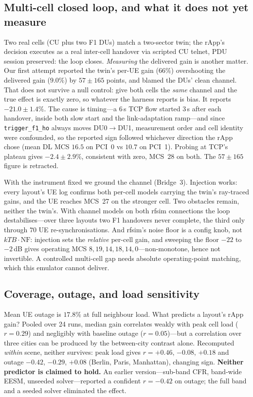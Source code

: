 \documentclass[conference]{IEEEtran}
\begin{document}
\subsection{Multi-cell closed loop, and what it does not yet measure}
\label{sec:multignb}
Two real cells (CU plus two F1 DUs) match a two-sector twin; the rApp's decision executes as a real inter-cell handover via scripted CU telnet, PDU session preserved: the loop closes. \emph{Measuring} the delivered gain is another matter. Our first attempt reported the twin's per-UE gain ($66\%$) overshooting the delivered gain ($9.0\%$) by $57\pm165$ points, and blamed the DUs' clean channel. That does not survive a null control: give both cells the \emph{same} channel and the true effect is exactly zero, so whatever the harness reports is bias. It reports $-21.0\pm1.4\%$. The cause is timing---a 6\,s TCP flow started 3\,s after each handover, inside both slow start and the link-adaptation ramp---and since \texttt{trigger\_f1\_ho} always moves DU0${\to}$DU1, measurement order and cell identity were confounded, so the reported sign followed whichever direction the rApp chose (mean DL MCS $16.5$ on PCI~0 vs $10.7$ on PCI~1). Probing at TCP's plateau gives $-2.4\pm2.9\%$, consistent with zero, MCS~28 on both. The $57\pm165$ figure is retracted.

With the instrument fixed we ground the channel (Bridge~3). Injection works: every layout's UE log confirms both per-cell models carrying the twin's ray-traced gains, and the UE reaches MCS~27 on the stronger cell. Two obstacles remain, neither the twin's. With channel models on both rfsim connections the loop destabilises---over three layouts two F1 handovers never complete, the third only through $70$ UE re-synchronisations. And rfsim's noise floor is a config knob, not $kTB\cdot\mathrm{NF}$: injection sets the \emph{relative} per-cell gain, and sweeping the floor $-22$ to $-2$\,dB gives operating MCS $8,19,14,18,14,0$---non-monotone, hence not invertible. A controlled multi-cell gap needs absolute operating-point matching, which this emulator cannot deliver.


\subsection{Coverage, outage, and load sensitivity}
Mean UE outage is $17.8\%$ at full neighbour load. What predicts a layout's rApp gain? Pooled over 24 runs, median gain correlates weakly with peak cell load ($r{=}0.29$) and negligibly with baseline outage ($r{=}0.05$)---but a correlation over three cities can be produced by the between-city contrast alone. Recomputed \emph{within} scene, neither survives: peak load gives $r{=}{+}0.46$, ${-}0.08$, ${+}0.18$ and outage ${-}0.42$, ${-}0.29$, ${+}0.08$ (Berlin, Paris, Manhattan), changing sign. \textbf{Neither predictor is claimed to hold.} An earlier version---sub-band CFR, band-wide EESM, unseeded solver---reported a confident $r{=}{-}0.42$ on outage; the full band and a seeded solver eliminated the effect.
\end{document}
